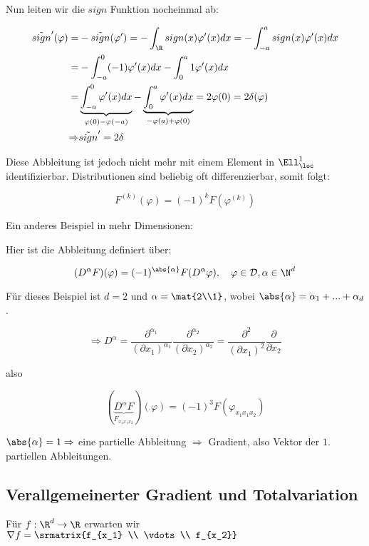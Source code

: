 Nun leiten wir die $sign$ Funktion nocheinmal ab:

\begin{align*}
    \tilde{sign}'(\varphi) =& -\tilde{sign}(\varphi') = - \int_\R sign(x) \varphi'(x) dx = - \int_{-a}^a sign(x) \varphi'(x) dx\\
    =&- \int_{-a}^0 (-1) \varphi'(x) dx - \int_0^a 1 \varphi'(x)dx\\
    =&\underbrace{\int_{-a}^0 \varphi'(x) dx}_{\varphi(0) - \varphi(-a)} - \underbrace{\int_0^a \varphi'(x)dx}_{-\varphi(a)+\varphi(0)} = 2 \varphi(0) = 2 \delta(\varphi)\\
    \Rightarrow & \tilde{sign}'=2\delta
\end{align*}

Diese Abbleitung ist jedoch nicht mehr mit einem Element in $\Ell^1_{\loc}$ identifizierbar.
Distributionen sind beliebig oft differenzierbar, somit folgt:

\[F^{(k)}(\varphi) = (-1)^kF(\varphi^{(k)})\]

Ein anderes Beispiel in mehr Dimensionen:

Hier ist die Abbleitung definiert über:

\[(D^\alpha F)(\varphi) = (-1)^{\abs{\alpha}}F(D^{\alpha} \varphi), \quad \varphi \in \mathcal{D}, \alpha \in \N^d\]

Für dieses Beispiel ist $d=2$ und $\alpha = \mat{2\\1}$, wobei $\abs{\alpha} = \alpha_1 + ... +\alpha_d$.

\[\Rightarrow D^\alpha = \frac{\partial^{\alpha_1}}{(\partial x_1)^{\alpha_1}}\frac{\partial^{\alpha_2}}{(\partial x_2)^{\alpha_2}} = \frac{\partial^{2}}{(\partial x_1)^{2}} \frac{\partial}{\partial x_2}\]

also

\[(\underbrace{D^\alpha F}_{F_{x_1 x_1 x_2}})(\varphi) = (-1)^{3}F(\varphi_{x_1 x_1 x_2})\]

$\abs{\alpha}=1 \Rightarrow $ eine partielle Abbleitung $\Rightarrow$ Gradient, also Vektor der $1.$ partiellen Abbleitungen.

\subsection{Verallgemeinerter Gradient und Totalvariation}

Für $f:\R^d \to \R$ erwarten wir $\nabla f = \srmatrix{f_{x_1} \\ \vdots \\ f_{x_2}}$

